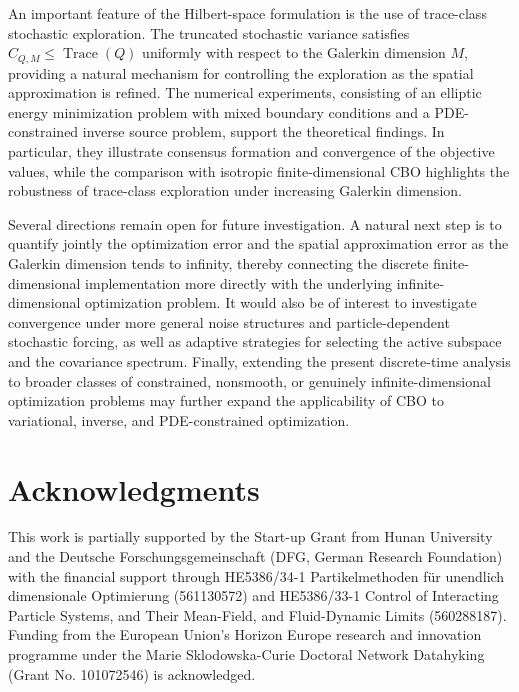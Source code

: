 \documentclass[12pt]{amsart}
\numberwithin{equation}{section}
\begin{document}
An important feature of the Hilbert-space formulation is the use of trace-class stochastic exploration. The truncated stochastic variance satisfies $C_{Q,M}\leq \operatorname{Trace}(Q)$ uniformly with respect to the Galerkin dimension $M$, providing a natural mechanism for controlling the exploration as the spatial approximation is refined. The numerical experiments, consisting of an elliptic energy minimization problem with mixed boundary conditions and a PDE-constrained inverse source problem, support the theoretical findings. In particular, they illustrate consensus formation and convergence of the objective values, while the comparison with isotropic finite-dimensional CBO highlights the robustness of trace-class exploration under increasing Galerkin dimension.

Several directions remain open for future investigation. A natural next step is to quantify jointly the optimization error and the spatial approximation error as the Galerkin dimension tends to infinity, thereby connecting the discrete finite-dimensional implementation more directly with the underlying infinite-dimensional optimization problem. It would also be of interest to investigate convergence under more general noise structures and particle-dependent stochastic forcing, as well as adaptive strategies for selecting the active subspace and the covariance spectrum. Finally, extending the present discrete-time analysis to broader classes of constrained, nonsmooth, or genuinely infinite-dimensional optimization problems may further expand the applicability of CBO to variational, inverse, and PDE-constrained optimization.




\section*{Acknowledgments}

This work is partially supported by the Start-up Grant from Hunan University and the Deutsche Forschungsgemeinschaft (DFG, German Research Foundation) with the financial support through HE5386/34-1 Partikelmethoden für unendlich dimensionale Optimierung (561130572) and HE5386/33-1 Control of Interacting Particle Systems, and Their Mean-Field, and Fluid-Dynamic Limits (560288187). Funding from the European Union’s Horizon Europe research and innovation programme under the Marie Sklodowska-Curie Doctoral Network Datahyking (Grant No. 101072546) is acknowledged. 
\end{document}
